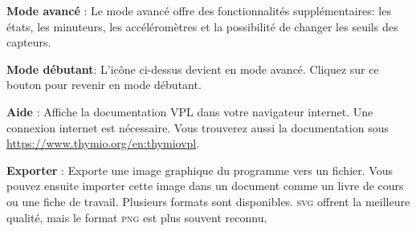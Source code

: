 \textbf{Mode avancé} : Le mode avancé offre des fonctionnalités supplémentaires:
les états, les minuteurs, les accéléromètres et la possibilité de changer les seuils des capteurs.

\textbf{Mode débutant}: L'icône ci-dessus devient  en mode avancé.
Cliquez sur ce bouton pour revenir en mode débutant.

\newpage

\textbf{Aide} : Affiche la documentation VPL dans votre navigateur internet.
Une connexion internet est nécessaire. Vous trouverez aussi la documentation sous
\href{https://www.thymio.org/en:thymiovpl}{https://www.thymio.org/en:thymiovpl}.

\bigskip

\textbf{Exporter} : \label{p.export} Exporte une image graphique du programme vers
un fichier. Vous pouvez ensuite importer cette image dans un document comme un livre de cours
ou une fiche de travail.
Plusieurs formats sont disponibles. \textsc{svg} offrent la meilleure qualité, mais le format
\textsc{png} est plus souvent reconnu.
